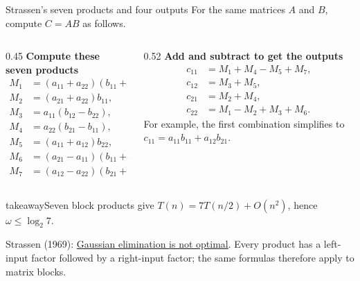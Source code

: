 \documentclass[aspectratio=169,11pt]{beamer}
\newcommand{\source}[1]{\vfill\par{\fontsize{7.5}{9}\selectfont\color{muted}#1\par}}
\newcommand{\takeaway}[1]{\begin{beamercolorbox}[sep=0.65em,wd=\linewidth]{takeaway}#1\end{beamercolorbox}}
\begin{document}
\begin{frame}{Strassen's seven products and four outputs}
  For the same matrices $A$ and $B$, compute $C=AB$ as follows.
  \medskip
  \begin{columns}[T,onlytextwidth]
    \begin{column}{0.45\textwidth}
      \textbf{Compute these seven products}
      \[
      \begin{aligned}
        M_1&=(a_{11}+a_{22})(b_{11}+b_{22}),\\
        M_2&=(a_{21}+a_{22})b_{11},\\
        M_3&=a_{11}(b_{12}-b_{22}),\\
        M_4&=a_{22}(b_{21}-b_{11}),\\
        M_5&=(a_{11}+a_{12})b_{22},\\
        M_6&=(a_{21}-a_{11})(b_{11}+b_{12}),\\
        M_7&=(a_{12}-a_{22})(b_{21}+b_{22}).
      \end{aligned}
      \]
    \end{column}
    \begin{column}{0.52\textwidth}
      \textbf{Add and subtract to get the outputs}
      \[
      \begin{aligned}
        c_{11}&=M_1+M_4-M_5+M_7,\\
        c_{12}&=M_3+M_5,\\
        c_{21}&=M_2+M_4,\\
        c_{22}&=M_1-M_2+M_3+M_6.
      \end{aligned}
      \]
      For example, the first combination simplifies to
      $c_{11}=a_{11}b_{11}+a_{12}b_{21}$.
    \end{column}
  \end{columns}
  \takeaway{Seven block products give
    $\displaystyle T(n)=7T(n/2)+O(n^2)$, hence $\omega\le\log_2 7$.}
  \source{Strassen (1969):
  \href{https://doi.org/10.1007/BF02165411}{Gaussian elimination is not optimal}.
  Every product has a left-input factor followed by a right-input factor;
  the same formulas therefore apply to matrix blocks.}
\end{frame}
\end{document}
